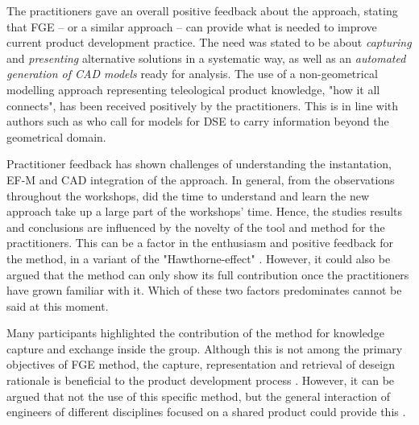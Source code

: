 \documentclass[aerospace,article,submit,moreauthors,pdftex]{Definitions/mdpi}
\newcommand{\Jakob}[1]{{{\color{orange}{\itshape{#1}}\color{black}}
    }{\ignorespaces}}
\begin{document}
The practitioners gave an overall positive feedback about the approach, stating that \ac{FGE} -- or a similar approach -- can provide what is needed to improve current product development practice.
The need was stated to be about \textit{capturing} and \textit{presenting} alternative solutions in a systematic way, as well as an \textit{automated generation of CAD models} ready for analysis.
The use of a non-geometrical modelling approach representing teleological product knowledge, "how it all connects", has been received positively by the practitioners.
This is in line with authors such as \cite{Woodbury2006, Cohrs2014, Umeda1997} who call for models for \ac{DSE} to carry information beyond the geometrical domain.


Practitioner feedback has shown challenges of understanding the instantation, \ac{EF-M} and CAD integration of the approach.
In general, from the observations throughout the workshops, did the time to understand and learn the new approach take up a large part of the workshops' time.
Hence, the studies results and conclusions are influenced by the novelty of the tool and method for the practitioners.
This can be a factor in the enthusiasm and positive feedback for the method, in a variant of the "Hawthorne-effect" \cite{MaccarneyHawthorne}.
However, it could also be argued that the method can only show its full contribution once the practitioners have grown familiar with it.
Which of these two factors predominates cannot be said at this moment.

Many participants highlighted the contribution of the method for knowledge capture and exchange inside the group.
Although this is not among the primary objectives of \ac{FGE} method, the capture, representation and retrieval of deseign rationale is beneficial to the product development process \cite{Stokes2001}.
However, it can be argued that not the use of this specific method, but the general interaction of engineers of different disciplines focused on a shared product could provide this \cite{Tayal2012}.


\end{document}
